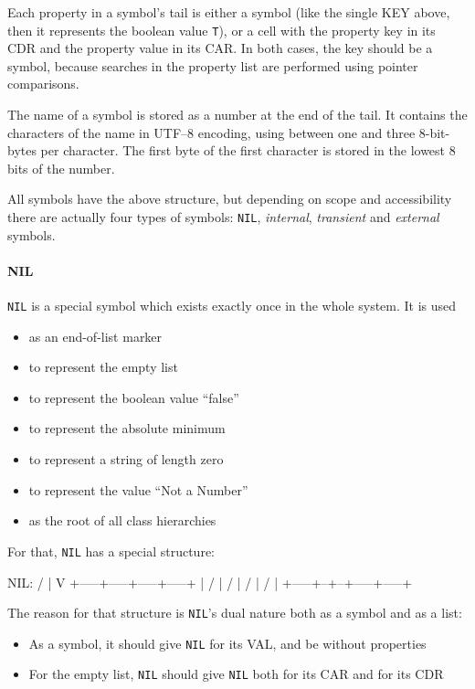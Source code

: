 Each property in a symbol's tail is either a symbol (like the single KEY
above, then it represents the boolean value \texttt{T}), or a cell with the
property key in its CDR and the property value in its CAR. In both
cases, the key should be a symbol, because searches in the property list
are performed using pointer comparisons.

The name of a symbol is stored as a number at the end of the tail. It
contains the characters of the name in UTF--8 encoding, using between
one and three 8-bit-bytes per character. The first byte of the first
character is stored in the lowest 8 bits of the number.

All symbols have the above structure, but depending on scope and
accessibility there are actually four types of symbols: \texttt{NIL},
\emph{internal}, \emph{transient} and
\emph{external} symbols.


\paragraph{NIL}
\label{sec:refm-nil}%
\texttt{NIL} is a special symbol which exists exactly once in the whole system.
It is used

\begin{itemize}
\item as an end-of-list marker
\item to represent the empty list
\item to represent the boolean value ``false''
\item to represent the absolute minimum
\item to represent a string of length zero
\item to represent the value ``Not a Number''
\item as the root of all class hierarchies
\end{itemize}

For that, \texttt{NIL} has a special structure:


\begin{wideverbatim}
NIL:  /
      |
      V
+-----+-----+-----+-----+
|  /  |  /  |  /  |  /  |
+-----+--+--+-----+-----+
\end{wideverbatim}

The reason for that structure is \texttt{NIL}'s dual nature both as a symbol
and as a list:

\begin{itemize}
\item As a symbol, it should give \texttt{NIL} for its VAL, and be without
   properties
\item For the empty list, \texttt{NIL} should give \texttt{NIL} both for its CAR and for
   its CDR
\end{itemize}

